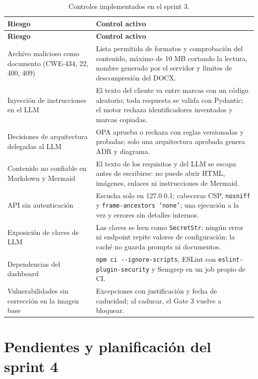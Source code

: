 \documentclass[11pt,a4paper]{report}
\begin{document}
{\small
\begin{longtable}{@{}P{4.2cm}P{10.2cm}@{}}
\caption{Controles implementados en el sprint 3.}\\
\toprule
\textbf{Riesgo} & \textbf{Control activo}\\
\midrule
\endfirsthead
\toprule
\textbf{Riesgo} & \textbf{Control activo}\\
\midrule
\endhead
Archivo malicioso como documento (CWE-434, 22, 400, 409) & Lista permitida de formatos y comprobación del contenido, máximo de 10 MB cortando la lectura, nombre generado por el servidor y límites de descompresión del DOCX.\\
Inyección de instrucciones en el LLM & El texto del cliente va entre marcas con un código aleatorio; toda respuesta se valida con Pydantic; el motor rechaza identificadores inventados y marcas copiadas.\\
Decisiones de arquitectura delegadas al LLM & OPA aprueba o rechaza con reglas versionadas y probadas; solo una arquitectura aprobada genera ADR y diagrama.\\
Contenido no confiable en Markdown y Mermaid & El texto de los requisitos y del LLM se escapa antes de escribirse: no puede abrir HTML, imágenes, enlaces ni instrucciones de Mermaid.\\
API sin autenticación & Escucha solo en 127.0.0.1; cabeceras CSP, \texttt{nosniff} y \texttt{frame-ancestors 'none'}; una ejecución a la vez y errores sin detalles internos.\\
Exposición de claves de LLM & Las claves se leen como \texttt{SecretStr}; ningún error ni endpoint repite valores de configuración; la caché no guarda prompts ni documentos.\\
Dependencias del dashboard & \texttt{npm ci -{}-ignore-scripts}, ESLint con \texttt{eslint-plugin-security} y Semgrep en un job propio de CI.\\
Vulnerabilidades sin corrección en la imagen base & Excepciones con justificación y fecha de caducidad; al caducar, el Gate 3 vuelve a bloquear.\\
\bottomrule
\end{longtable}}

\chapter{Pendientes y planificación del sprint 4}
\end{document}
